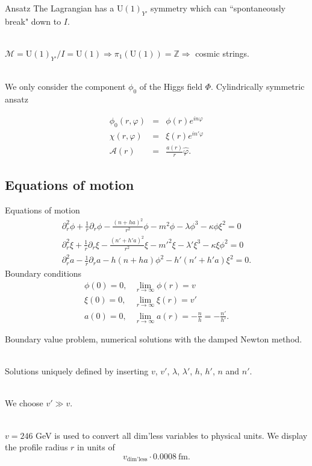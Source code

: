 \documentclass[14pt]{beamer}
\begin{document}
\begin{frame}{Ansatz}
The Lagrangian has a U$(1)_{Y'}$ symmetry which can ``spontaneously break" down to $I$. \\~\

$\mathcal{M} = \text{U}(1)_{Y'}/I=\text{U}(1) \Rightarrow \pi_1(\text{U}(1)) = \mathbb{Z} \Rightarrow$ cosmic strings. \\~\

We only consider the component $\phi_0$ of the Higgs field $\Phi$. Cylindrically symmetric ansatz

\begin{eqnarray*}
	\phi_0(r,\varphi) & = & \phi(r) e^{in\varphi} \\
	\chi(r,\varphi) & = & \xi(r) e^{in'\varphi} \\
	\mathbf{\mathcal{A}}(r) & = & \frac{a(r)}{r} \hat{\varphi}.
\end{eqnarray*}

\end{frame}
\subsection{Equations of motion}
\begin{frame}{Equations of motion}
\begin{eqnarray*}
\partial_r^2 \phi + \frac{1}{r} \partial_r \phi- \frac{\left(n+ha\right)^2}{r^2}\phi- m^2 \phi- \lambda \phi^3-\kappa \phi \xi^2 = 0 \\
\partial_r^2 \xi + \frac{1}{r} \partial_r \xi - \frac{\left(n'+h'a\right)^2}{r^2}\xi -m'^2\xi - \lambda' \xi^3 -\kappa \xi \phi^2 = 0\\
\partial_r^2a -\frac{1}{r}\partial_r a-h(n+ha)\phi^2-h'(n' + h'a )\xi^2 = 0.
\end{eqnarray*}
Boundary conditions
\begin{eqnarray*}
	\phi(0)=0, & \displaystyle\lim_{r\to\infty}\phi(r) = v \\
	 \xi(0)=0, &  \displaystyle\lim_{r\to\infty}\xi(r) = v' \\
	 a(0)=0, & \displaystyle \lim_{r\to\infty}a(r) = -\frac{n}{h}=-\frac{n'}{h'} .
\end{eqnarray*}

\end{frame}

\begin{frame}

Boundary value problem, numerical solutions with the damped Newton method.\\~\

Solutions uniquely defined by inserting $v$, $v'$, $\lambda$, $\lambda'$, $h$, $h'$, $n$ and $n'$.\\~\

We choose $v'\gg v$. \\~\

$v=246$ GeV is used to convert all dim'less variables to physical units. 
We display the profile radius $r$ in units of  
\begin{equation*}
	 v_{\text{dim'less}}\cdot 0.0008\ \text{fm}.
\end{equation*}

\end{frame}
\end{document}
